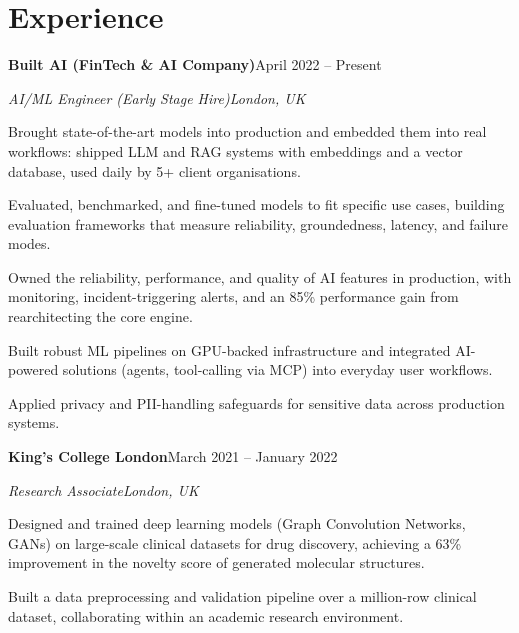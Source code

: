 \documentclass[10pt,a4paper]{article}
\newcommand{\entry}[4]{%
  {\color{company}\bfseries #1}\hfill {\color{muted}#2}\par
  \vspace{1pt}
  {\itshape #3}\hfill {\color{muted}\itshape #4}\par
  \vspace{3pt}%
}
\begin{document}
\section{Experience}
\entry{Built AI (FinTech \& AI Company)}{April 2022 -- Present}{AI/ML Engineer (Early Stage Hire)}{London, UK}
\begin{tight}
  \item Brought state-of-the-art models into production and embedded them into real workflows: shipped LLM and RAG systems with embeddings and a vector database, used daily by 5+ client organisations.
  \item Evaluated, benchmarked, and fine-tuned models to fit specific use cases, building evaluation frameworks that measure reliability, groundedness, latency, and failure modes.
  \item Owned the reliability, performance, and quality of AI features in production, with monitoring, incident-triggering alerts, and an 85\% performance gain from rearchitecting the core engine.
  \item Built robust ML pipelines on GPU-backed infrastructure and integrated AI-powered solutions (agents, tool-calling via MCP) into everyday user workflows.
  \item Applied privacy and PII-handling safeguards for sensitive data across production systems.
\end{tight}

\entry{King's College London}{March 2021 -- January 2022}{Research Associate}{London, UK}
\begin{tight}
  \item Designed and trained deep learning models (Graph Convolution Networks, GANs) on large-scale clinical datasets for drug discovery, achieving a 63\% improvement in the novelty score of generated molecular structures.
  \item Built a data preprocessing and validation pipeline over a million-row clinical dataset, collaborating within an academic research environment.
\end{tight}

\end{document}
